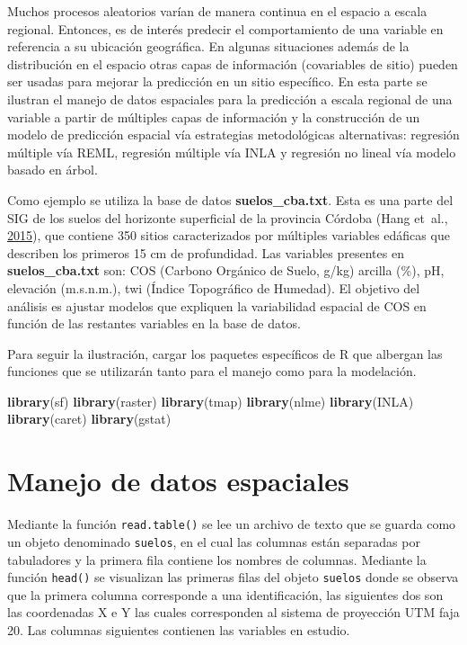 \documentclass[11pt,b5paper,]{krantz}
\newenvironment{Shaded}{}{}
\newcommand{\KeywordTok}[1]{\textcolor[rgb]{0.00,0.44,0.13}{\textbf{#1}}}
\newcommand{\NormalTok}[1]{#1}
\begin{document}
Muchos procesos aleatorios varían de manera continua en el espacio a
escala regional. Entonces, es de interés predecir el comportamiento de
una variable en referencia a su ubicación geográfica. En algunas
situaciones además de la distribución en el espacio otras capas de
información (covariables de sitio) pueden ser usadas para mejorar la
predicción en un sitio específico. En esta parte se ilustran el manejo
de datos espaciales para la predicción a escala regional de una variable
a partir de múltiples capas de información y la construcción de un
modelo de predicción espacial vía estrategias metodológicas
alternativas: regresión múltiple vía REML, regresión múltiple vía INLA y
regresión no lineal vía modelo basado en árbol.

Como ejemplo se utiliza la base de datos \textbf{suelos\_cba.txt}. Esta
es una parte del SIG de los suelos del horizonte superficial de la
provincia Córdoba (Hang et~al., \protect\hyperlink{ref-Hang2015}{2015}),
que contiene 350 sitios caracterizados por múltiples variables edáficas
que describen los primeros 15 cm de profundidad. Las variables presentes
en \textbf{suelos\_cba.txt} son: COS (Carbono Orgánico de Suelo, g/kg)
arcilla (\%), pH, elevación (m.s.n.m.), twi (Índice Topográfico de
Humedad). El objetivo del análisis es ajustar modelos que expliquen la
variabilidad espacial de COS en función de las restantes variables en la
base de datos.

Para seguir la ilustración, cargar los paquetes específicos de R que
albergan las funciones que se utilizarán tanto para el manejo como para
la modelación.

\begin{Shaded}
\begin{Highlighting}[]
\KeywordTok{library}\NormalTok{(sf)}
\KeywordTok{library}\NormalTok{(raster)}
\KeywordTok{library}\NormalTok{(tmap)}
\KeywordTok{library}\NormalTok{(nlme)}
\KeywordTok{library}\NormalTok{(INLA)}
\KeywordTok{library}\NormalTok{(caret)}
\KeywordTok{library}\NormalTok{(gstat)}
\end{Highlighting}
\end{Shaded}

\section{Manejo de datos espaciales}\label{manejo-de-datos-espaciales-1}

Mediante la función \texttt{read.table()} se lee un archivo de texto que
se guarda como un objeto denominado \texttt{suelos}, en el cual las
columnas están separadas por tabuladores y la primera fila contiene los
nombres de columnas. Mediante la función \texttt{head()} se visualizan
las primeras filas del objeto \texttt{suelos} donde se observa que la
primera columna corresponde a una identificación, las siguientes dos son
las coordenadas X e Y las cuales corresponden al sistema de proyección
UTM faja 20. Las columnas siguientes contienen las variables en estudio.
\end{document}
